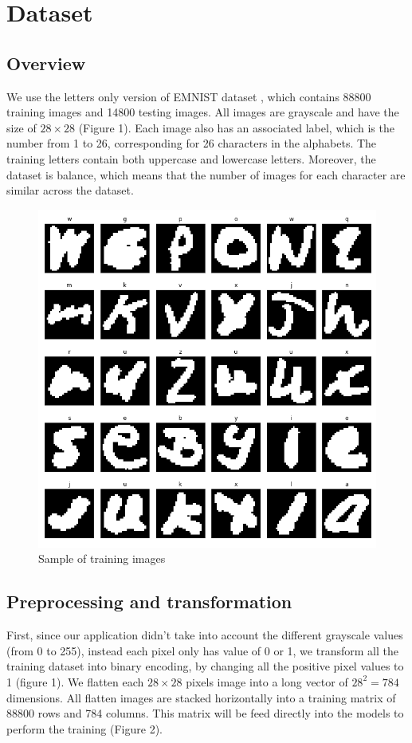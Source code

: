\documentclass[12,]{article}
\begin{document}
\hypertarget{dataset}{%
\section{Dataset}\label{dataset}}

\hypertarget{overview}{%
\subsection{Overview}\label{overview}}

We use the letters only version of EMNIST dataset \cite{emnist}, which
contains 88800 training images and 14800 testing images. All images are
grayscale and have the size of \(28 \times 28\) (Figure 1). Each image
also has an associated label, which is the number from 1 to 26,
corresponding for 26 characters in the alphabets. The training letters
contain both uppercase and lowercase letters. Moreover, the dataset is
balance, which means that the number of images for each character are
similar across the dataset.

\begin{figure}[H]
  \begin{center}
  \includegraphics[width=0.4\columnwidth]{./sample.png}
  \end{center}
  \caption{Sample of training images}
\end{figure}

\hypertarget{preprocessing-and-transformation}{%
\subsection{Preprocessing and
transformation}\label{preprocessing-and-transformation}}

First, since our application didn't take into account the different
grayscale values (from 0 to 255), instead each pixel only has value of 0
or 1, we transform all the training dataset into binary encoding, by
changing all the positive pixel values to 1 (figure 1). We flatten each
\(28 \times 28\) pixels image into a long vector of \(28^2 = 784\)
dimensions. All flatten images are stacked horizontally into a training
matrix of 88800 rows and 784 columns. This matrix will be feed directly
into the models to perform the training (Figure 2).
\end{document}
